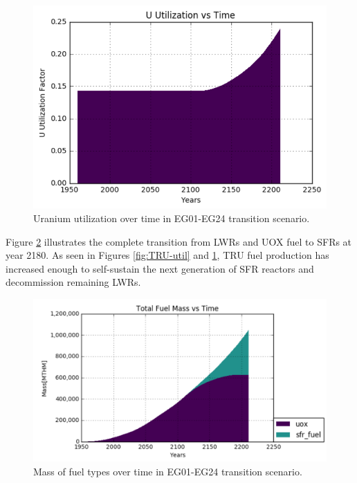 \begin{figure} [h]
	\includegraphics[width=0.8\linewidth]{images/u-util}
	\caption{Uranium utilization over time in EG01-EG24 transition scenario.}
	\label{fig:u-util}
\end{figure}

Figure \ref{fig:fuel-mass} illustrates the complete transition from LWRs and UOX fuel to SFRs at year 2180. As seen in Figures \ref{fig:TRU-util} and \ref{fig:u-util}, TRU fuel
production has increased enough to self-sustain the next generation of SFR reactors and decommission remaining LWRs.

\begin{figure}[h]
	\includegraphics[width=\linewidth]{images/transition-fuelmass}
	\caption{Mass of fuel types over time in EG01-EG24 transition scenario.}
	\label{fig:fuel-mass}
\end{figure}